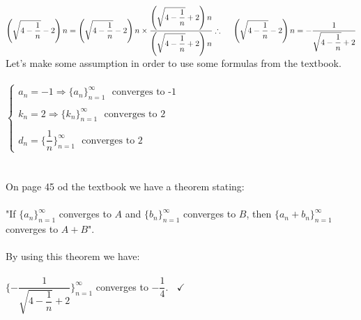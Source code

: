 \documentclass[fleqn]{article}
\begin{document}
\begin{enumerate}
      \textcolor{hwColor}{
        \\
        $
          \left(\sqrt{4-\dfrac{1}{n}}-2\right)n=\left(\sqrt{4-\dfrac{1}{n}}-2\right)n \times \dfrac{\left(\sqrt{4-\dfrac{1}{n}}+2\right)n}{\left(\sqrt{4-\dfrac{1}{n}}+2\right)n}
          \\
          \\
          \\
          \therefore ~~~~ \left(\sqrt{4-\dfrac{1}{n}}-2\right)n=-\dfrac{1}{\sqrt{4-\dfrac{1}{n}}+2}
        $
        Let's make some assumption in order to use some formulas from the textbook.
        \\
        \\
        $
          \begin{cases}
            a_n=-1 \Longrightarrow \{a_n\}_{n=1}^{\infty} ~~~ \textrm{converges to -1}
            \\
            \\
            k_n=2 \Longrightarrow \{k_n\}_{n=1}^{\infty} ~~~ \textrm{converges to 2}
            \\
            \\
            d_n=\{\dfrac{1}{n}\}_{n=1}^{\infty} ~~~ \textrm{converges to 2}
          \end{cases}
        $
        \\
        \\
        \\
        On page 45 od the textbook we have a theorem stating:
        \\
        \\
        "If $\{a_n\}_{n=1}^{\infty}$ converges to $A$ and $\{b_n\}_{n=1}^{\infty}$
        converges to $B$, then $\{a_n+b_n\}_{n=1}^{\infty}$ converges to $A+B$". 
        \\
        \\
        By using this theorem we have:
        \\
        \\
        $
          \{-\dfrac{1}{\sqrt{4-\dfrac{1}{n}}+2}\}_{n=1}^{\infty}
        $ converges to $-\dfrac{1}{4}. ~~~~ \checkmark$
      }

  \end{enumerate}
\end{document}
